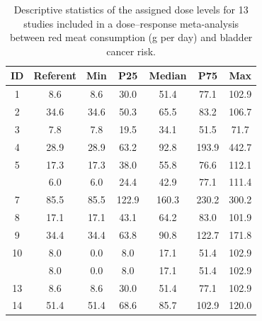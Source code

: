 \documentclass[11pt,a4paper,twoside,openany]{book}\usepackage{knitr}
\begin{document}
{{\begin{knitrout}
\begin{table}[!h]
\caption{\label{tab:chr_redtab}Descriptive statistics of the assigned dose levels for 13 studies 
      included in a dose--response meta-analysis between red meat consumption (g per day) and bladder
      cancer risk.}
\centering
\begin{tabular}[t]{ccccccc}
\toprule
ID & Referent & Min & P25 & Median & P75 & Max\\
\midrule
1 & 8.6 & 8.6 & 30.0 & 51.4 & 77.1 & 102.9\\
2 & 34.6 & 34.6 & 50.3 & 65.5 & 83.2 & 106.7\\
3 & 7.8 & 7.8 & 19.5 & 34.1 & 51.5 & 71.7\\
4 & 28.9 & 28.9 & 63.2 & 92.8 & 193.9 & 442.7\\
5 & 17.3 & 17.3 & 38.0 & 55.8 & 76.6 & 112.1\\
\addlinespace
6 & 6.0 & 6.0 & 24.4 & 42.9 & 77.1 & 111.4\\
7 & 85.5 & 85.5 & 122.9 & 160.3 & 230.2 & 300.2\\
8 & 17.1 & 17.1 & 43.1 & 64.2 & 83.0 & 101.9\\
9 & 34.4 & 34.4 & 63.8 & 90.8 & 122.7 & 171.8\\
10 & 8.0 & 0.0 & 8.0 & 17.1 & 51.4 & 102.9\\
\addlinespace
11 & 8.0 & 0.0 & 8.0 & 17.1 & 51.4 & 102.9\\
13 & 8.6 & 8.6 & 30.0 & 51.4 & 77.1 & 102.9\\
14 & 51.4 & 51.4 & 68.6 & 85.7 & 102.9 & 120.0\\
\bottomrule
\end{tabular}
\end{table}


\end{knitrout}


}}
\end{document}
